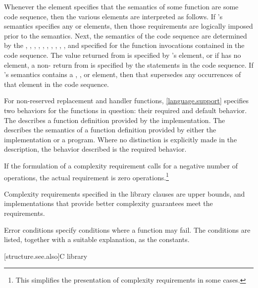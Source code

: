 \pnum
Whenever the  element specifies that the semantics of some function
 are  some code sequence, then the various elements are
interpreted as follows.
If 's semantics specifies any  or  elements,
then those requirements are logically imposed prior to the  semantics.
Next, the semantics of the code sequence are determined by the
, , , ,
, , , ,
, , and 
specified for the function invocations contained in the code sequence.
The value returned from  is specified by 's  element,
or if  has no  element,
a non- return from  is specified by the
 statements in the code sequence.
If 's semantics contains a ,
, or  element,
then that supersedes any occurrences of that element in the code sequence.

\pnum
For non-reserved replacement and handler functions,
\ref{language.support} specifies two behaviors for the functions in question:
their required and default behavior.
The 
describes a function definition provided by the implementation.
The 
describes the semantics of a function definition provided by
either the implementation or a \Cpp{} program.
Where no distinction is explicitly made in the description, the
behavior described is the required behavior.

\pnum
If the formulation of a complexity requirement calls for a negative number of
operations, the actual requirement is zero operations.\footnote{This simplifies
the presentation of complexity requirements in some cases.}

\pnum
Complexity requirements specified in the library clauses are upper bounds,
and implementations that provide better complexity guarantees meet
the requirements.

\pnum
Error conditions specify conditions where a function may fail. The conditions
are listed, together with a suitable explanation, as the 
constants.

[structure.see.also]{C library}


